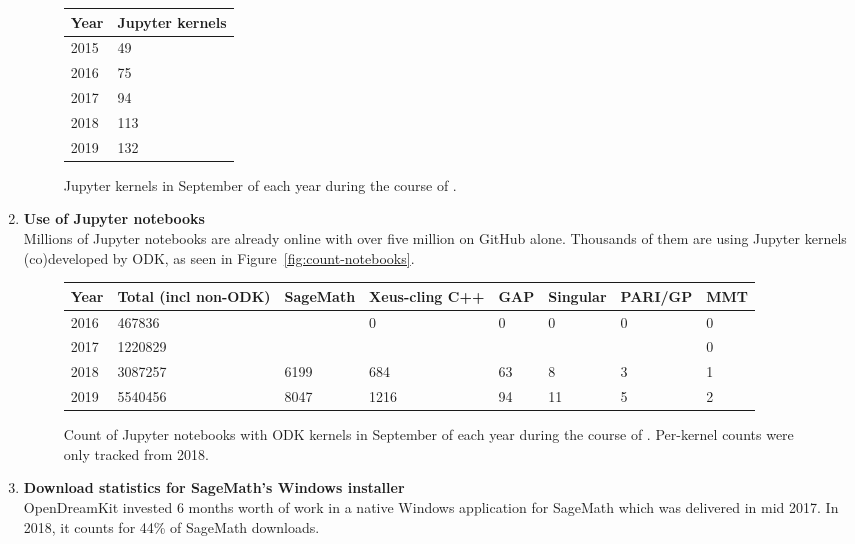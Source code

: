 \begin{enumerate}
  \begin{figure}
  \label{fig:count-kernels}
  \begin{tabular}{|l|l|}\hline
    Year & Jupyter kernels \\
    \hline
    2015 & 49 \\
    2016 & 75 \\
    2017 & 94 \\
    2018 & 113 \\
    2019 & 132 \\
    \hline
  \end{tabular}
  \caption{Jupyter kernels in September of each year
  during the course of \ODK.}
  \end{figure}

\item \textbf{Use of Jupyter notebooks}\\
  Millions of Jupyter notebooks are already online with over five million
  on GitHub alone. Thousands of them are using Jupyter kernels (co)developed by ODK, as seen in Figure~\ref{fig:count-notebooks}.

  \begin{figure}
  \label{fig:count-kernels}
  \begin{tabular}{|l|l|l|l|l|l|l|l|}\hline
    Year & Total (incl non-ODK) & SageMath & Xeus-cling C++ & GAP & Singular & PARI/GP & MMT \\
    \hline
    2016 & 467836 & & 0 & 0 & 0 & 0 & 0 \\
    2017 & 1220829 & & & & & & 0 \\
    2018 & 3087257 & 6199 & 684 & 63 & 8 & 3 & 1 \\
    2019 & 5540456 & 8047 & 1216 & 94 & 11 & 5 & 2\\
    \hline
  \end{tabular}
  \caption{Count of Jupyter notebooks with ODK kernels in September of each year
  during the course of \ODK.
  Per-kernel counts were only tracked from 2018.}
  \end{figure}

\item \textbf{Download statistics for SageMath's Windows installer}\\
  OpenDreamKit invested 6 months worth of work in a native Windows
  application for SageMath which was delivered in mid 2017. In 2018,
  it counts for 44\% of SageMath downloads.



\end{enumerate}
